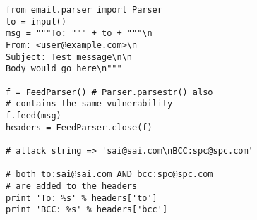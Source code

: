 \begin{lstlisting}
from email.parser import Parser
to = input()
msg = """To: """ + to + """\n
From: <user@example.com>\n
Subject: Test message\n\n
Body would go here\n"""

f = FeedParser() # Parser.parsestr() also 
# contains the same vulnerability
f.feed(msg)
headers = FeedParser.close(f)

# attack string => 'sai@sai.com\nBCC:spc@spc.com'

# both to:sai@sai.com AND bcc:spc@spc.com 
# are added to the headers
print 'To: %s' % headers['to']
print 'BCC: %s' % headers['bcc']
\end{lstlisting}
